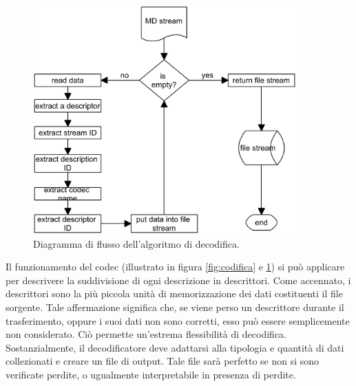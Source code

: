 \begin{figure}[ht]
\centering \includegraphics[width=0.90\textwidth]{../images/decodifica.png}
	\caption{Diagramma di flusso dell'algoritmo di decodifica.}
	\label{fig:decodifica}
\end{figure}

Il funzionamento del codec (illustrato in figura \ref{fig:codifica} e
\ref{fig:decodifica}) si può applicare per descrivere la suddivisione di ogni
descrizione in descrittori. Come accennato, i descrittori sono la più piccola unità di memorizzazione dei dati costituenti il file sorgente. Tale
affermazione significa che, se viene perso un descrittore durante il
trasferimento, oppure i suoi dati non sono corretti, esso può essere
semplicemente non considerato. Ciò permette un'estrema flessibilità di
decodifica. Sostanzialmente, il decodificatore deve adattarsi alla tipologia e
quantità di dati collezionati e creare un file di output. Tale file sarà perfetto se non si sono verificate perdite, o ugualmente interpretabile in presenza di perdite.

